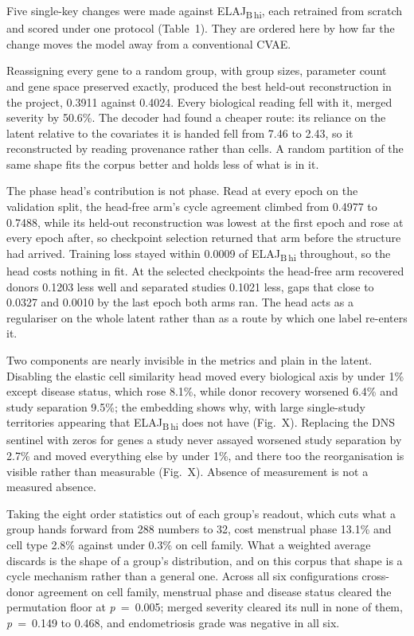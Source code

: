 \documentclass[11pt]{article}
\newcommand{\elaj}{ELAJ\xspace}
\begin{document}
Five single-key changes were made against \elaj\textsubscript{B\,hi}, each retrained
from scratch and scored under one protocol (Table~1). They are ordered here
by how far the change moves the model away from a conventional CVAE.

Reassigning every gene to a random group, with group sizes, parameter count
and gene space preserved exactly, produced the best held-out reconstruction
in the project, 0.3911 against 0.4024. Every biological reading fell with
it, merged severity by 50.6\%. The decoder had found a cheaper route: its
reliance on the latent relative to the covariates it is handed fell from
7.46 to 2.43, so it reconstructed by reading provenance rather than cells.
A random partition of the same shape fits the corpus better and holds less
of what is in it.

The phase head's contribution is not phase. Read at every epoch on the
validation split, the head-free arm's cycle agreement climbed from 0.4977 to
0.7488, while its held-out reconstruction was lowest at the first epoch and
rose at every epoch after, so checkpoint selection returned that arm before
the structure had arrived. Training loss stayed within 0.0009 of
\elaj\textsubscript{B\,hi} throughout, so the head costs nothing in fit. At the selected
checkpoints the head-free arm recovered donors 0.1203 less well and separated
studies 0.1021 less, gaps that close to 0.0327 and 0.0010 by the last epoch
both arms ran. The head acts as a regulariser on the whole latent rather
than as a route by which one label re-enters it.

Two components are nearly invisible in the metrics and plain in the latent.
Disabling the elastic cell similarity head moved every biological axis by
under 1\% except disease status, which rose 8.1\%, while donor recovery
worsened 6.4\% and study separation 9.5\%; the embedding shows why, with
large single-study territories appearing that \elaj\textsubscript{B\,hi} does not have
(Fig.~X). Replacing the DNS sentinel with zeros for genes a study never
assayed worsened study separation by 2.7\% and moved everything else by
under 1\%, and there too the reorganisation is visible rather than
measurable (Fig.~X). Absence of measurement is not a measured absence.

Taking the eight order statistics out of each group's readout, which cuts
what a group hands forward from 288 numbers to 32, cost menstrual phase
13.1\% and cell type 2.8\% against under 0.3\% on cell family. What a
weighted average discards is the shape of a group's distribution, and on
this corpus that shape is a cycle mechanism rather than a general one.
Across all six configurations cross-donor agreement on cell family,
menstrual phase and disease status cleared the permutation floor at
\textit{p}~=~0.005; merged severity cleared its null in none of them, \textit{p}~=~0.149
to 0.468, and endometriosis grade was negative in all six.
\end{document}
